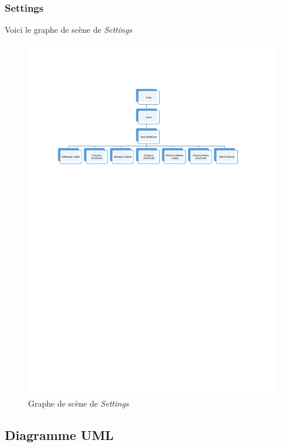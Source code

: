 \documentclass[a4paper, 10pt]{article}
\begin{document}
\subsubsection{Settings}
Voici le graphe de scène de \emph{Settings}
\begin{figure}[H]
\centering
\includegraphics[width=\textwidth]{./gds_settings.pdf}
\caption{Graphe de scène de \emph{Settings}}
\end{figure}
\subsection{Diagramme UML}
\end{document}
